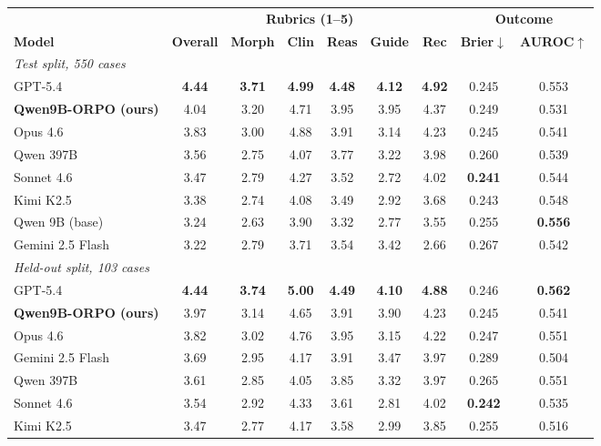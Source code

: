 \documentclass[11pt]{article}
\begin{document}
\begin{table}[H]
\centering
\small
\setlength{\tabcolsep}{3.2pt}
\begin{tabular}{lcccccccc}
\toprule
& \multicolumn{6}{c}{\textbf{Rubrics (1--5)}} & \multicolumn{2}{c}{\textbf{Outcome}} \\
\cmidrule(lr){2-7}\cmidrule(lr){8-9}
\textbf{Model} & \textbf{Overall} & \textbf{Morph} & \textbf{Clin} & \textbf{Reas} &
\textbf{Guide} & \textbf{Rec} & \textbf{Brier}$\downarrow$ & \textbf{AUROC}$\uparrow$ \\
\midrule
\multicolumn{9}{l}{\emph{Test split, 550 cases}} \\
GPT-5.4 & \textbf{4.44} & \textbf{3.71} & \textbf{4.99} & \textbf{4.48} & \textbf{4.12} & \textbf{4.92} & 0.245 & 0.553 \\
\textbf{Qwen9B-ORPO (ours)} & 4.04 & 3.20 & 4.71 & 3.95 & 3.95 & 4.37 & 0.249 & 0.531 \\
Opus 4.6 & 3.83 & 3.00 & 4.88 & 3.91 & 3.14 & 4.23 & 0.245 & 0.541 \\
Qwen 397B & 3.56 & 2.75 & 4.07 & 3.77 & 3.22 & 3.98 & 0.260 & 0.539 \\
Sonnet 4.6 & 3.47 & 2.79 & 4.27 & 3.52 & 2.72 & 4.02 & \textbf{0.241} & 0.544 \\
Kimi K2.5 & 3.38 & 2.74 & 4.08 & 3.49 & 2.92 & 3.68 & 0.243 & 0.548 \\
Qwen 9B (base) & 3.24 & 2.63 & 3.90 & 3.32 & 2.77 & 3.55 & 0.255 & \textbf{0.556} \\
Gemini 2.5 Flash & 3.22 & 2.79 & 3.71 & 3.54 & 3.42 & 2.66 & 0.267 & 0.542 \\
\midrule
\multicolumn{9}{l}{\emph{Held-out split, 103 cases}} \\
GPT-5.4 & \textbf{4.44} & \textbf{3.74} & \textbf{5.00} & \textbf{4.49} & \textbf{4.10} & \textbf{4.88} & 0.246 & \textbf{0.562} \\
\textbf{Qwen9B-ORPO (ours)} & 3.97 & 3.14 & 4.65 & 3.91 & 3.90 & 4.23 & 0.245 & 0.541 \\
Opus 4.6 & 3.82 & 3.02 & 4.76 & 3.95 & 3.15 & 4.22 & 0.247 & 0.551 \\
Gemini 2.5 Flash & 3.69 & 2.95 & 4.17 & 3.91 & 3.47 & 3.97 & 0.289 & 0.504 \\
Qwen 397B & 3.61 & 2.85 & 4.05 & 3.85 & 3.32 & 3.97 & 0.265 & 0.551 \\
Sonnet 4.6 & 3.54 & 2.92 & 4.33 & 3.61 & 2.81 & 4.02 & \textbf{0.242} & 0.535 \\
Kimi K2.5 & 3.47 & 2.77 & 4.17 & 3.58 & 2.99 & 3.85 & 0.255 & 0.516 \\

\end{tabular}
\end{table}
\end{document}
